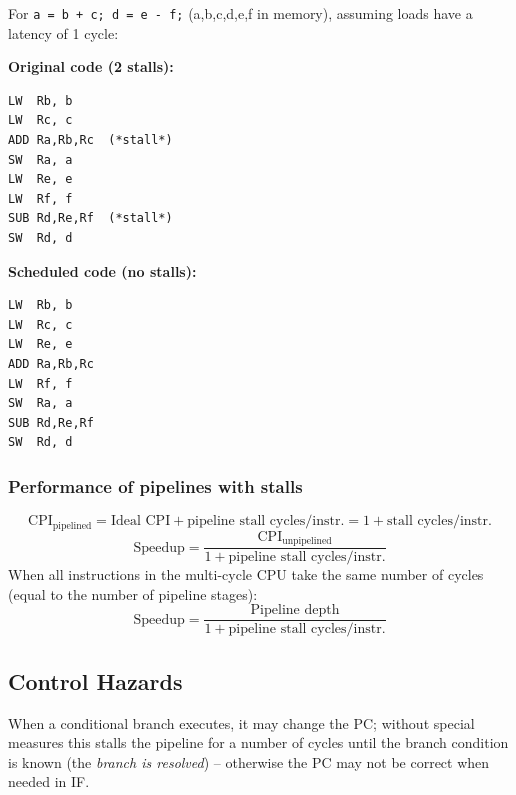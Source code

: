 \begin{eg}[Scheduling \texttt{a = b + c; d = e - f;}]
For \texttt{a = b + c;\ d = e - f;} (a,b,c,d,e,f in memory), assuming loads
have a latency of 1 cycle:

\begin{center}
\begin{minipage}{0.46\linewidth}
\textbf{Original code (2 stalls):}
\begin{lstlisting}
LW  Rb, b
LW  Rc, c
ADD Ra,Rb,Rc  (*stall*)
SW  Ra, a
LW  Re, e
LW  Rf, f
SUB Rd,Re,Rf  (*stall*)
SW  Rd, d
\end{lstlisting}
\end{minipage}\hfill
\begin{minipage}{0.46\linewidth}
\textbf{Scheduled code (no stalls):}
\begin{lstlisting}
LW  Rb, b
LW  Rc, c
LW  Re, e
ADD Ra,Rb,Rc
LW  Rf, f
SW  Ra, a
SUB Rd,Re,Rf
SW  Rd, d
\end{lstlisting}
\end{minipage}
\end{center}

\end{eg}

\subsubsection{Performance of pipelines with stalls}

\[
  \mathrm{CPI}_{\text{pipelined}} = \text{Ideal CPI} + \text{pipeline stall cycles/instr.} = 1 + \text{stall cycles/instr.}
\]
\[
  \text{Speedup} = \frac{\mathrm{CPI}_{\text{unpipelined}}}{1+\text{pipeline stall cycles/instr.}}
\]
When all instructions in the multi-cycle CPU take the same number of cycles
(equal to the number of pipeline stages):
\[
  \text{Speedup} = \frac{\text{Pipeline depth}}{1+\text{pipeline stall cycles/instr.}}
\]

\subsection{Control Hazards}

\begin{definition}
When a conditional branch executes, it may change the PC; without special
measures this stalls the pipeline for a number of cycles until the branch
condition is known (the \emph{branch is resolved}) -- otherwise the PC may
not be correct when needed in IF.
\end{definition}

